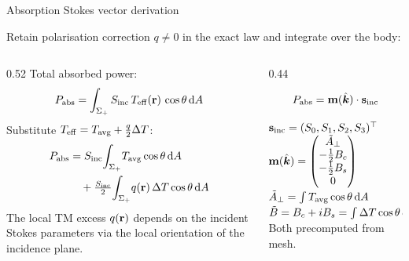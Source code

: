 
\begin{frame}[label=app-p2-stokes]{Absorption Stokes vector derivation}

  {\small Retain polarisation correction $q \neq 0$ in the exact law and integrate over the body:}
  \vspace{0pt}
  \begin{columns}[T]
    \begin{column}{0.52\textwidth}
      {\small Total absorbed power:}
      \[
        P_{\mathrm{abs}} = \int_{\Sigma_+} S_{\mathrm{inc}}\,T_{\mathrm{eff}}(\mathbf{r})\,\cos\theta\,\mathrm{d} A
      \]
      \vspace{-4pt}
      {\small Substitute $T_{\mathrm{eff}} = T_{\mathrm{avg}} + \tfrac{q}{2}\Delta T$:}
      \begin{align*}
        P_{\mathrm{abs}} &= S_{\mathrm{inc}}\!\int_{\Sigma_+}\!T_{\mathrm{avg}}\cos\theta\,\mathrm{d} A \\
        &\quad + \tfrac{S_{\mathrm{inc}}}{2}\!\int_{\Sigma_+}\! q(\mathbf{r})\,\Delta T\cos\theta\,\mathrm{d} A
      \end{align*}
      \vspace{-4pt}
      {\small The local TM excess $q(\mathbf{r})$ depends on the incident Stokes parameters via the local orientation of the incidence plane.}
    \end{column}
    \begin{column}{0.44\textwidth}
      \begin{resultbox}[Result]
        \vspace{-4pt}
        \[
          P_{\mathrm{abs}} = \mathbf{m}(\hat{\bm{k}}) \cdot \mathbf{s}_{\mathrm{inc}}
        \]
      \end{resultbox}
      \vspace{1pt}
      {\small $\mathbf{s}_{\mathrm{inc}} = (S_0, S_1, S_2, S_3)^\top$}
      \vspace{1pt}
      $\mathbf{m}(\hat{\bm{k}}) = \begin{pmatrix} \tilde{A}_\perp \\ -\tfrac{1}{2} B_c \\ -\tfrac{1}{2} B_s \\ 0 \end{pmatrix}$
      \vspace{1pt}
      {\footnotesize $\tilde{A}_\perp = \int T_{\mathrm{avg}}\cos\theta\,\mathrm{d} A$\\
       $\tilde{B} = B_c + iB_s = \int \Delta T\cos\theta\, e^{2i\alpha}\,\mathrm{d} A$\\
       Both precomputed from mesh.}
    \end{column}
  \end{columns}
  \vspace{-2pt}
  \quad{}
\end{frame}

